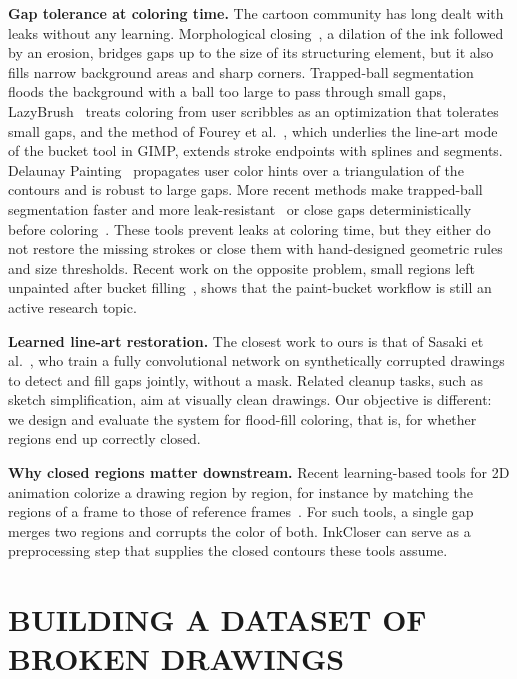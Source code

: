 \documentclass{IEEEcsmag}
\begin{document}
\textbf{Gap tolerance at coloring time.} The cartoon community has long dealt with
leaks without any learning. Morphological closing~\cite{serra1982morphology}, a
dilation of the ink followed by an erosion, bridges gaps up to the size of its
structuring element, but it also fills narrow background areas and sharp corners.
Trapped-ball segmentation~\cite{zhang2009vectorizing} floods the background with a
ball too large to pass through small gaps, LazyBrush~\cite{sykora2009lazybrush}
treats coloring from user scribbles as an optimization that tolerates small gaps,
and the method of Fourey et al.~\cite{fourey2018flat}, which underlies the line-art
mode of the bucket tool in GIMP, extends stroke endpoints with splines and segments.
Delaunay Painting~\cite{parakkat2022delaunay} propagates user color hints over a
triangulation of the contours and is robust to large gaps. More recent methods make
trapped-ball segmentation faster and more leak-resistant~\cite{allen2024leak} or
close gaps deterministically before coloring~\cite{asrin2025gap}. These tools prevent leaks
at coloring time, but they either do not restore the missing strokes or close them
with hand-designed geometric rules and size thresholds. Recent work on the opposite
problem, small regions left unpainted after bucket filling~\cite{kono2026gapfill},
shows that the paint-bucket workflow is still an active research topic.

\textbf{Learned line-art restoration.} The closest work to ours is that of Sasaki et
al.~\cite{sasaki2017joint}, who train a fully convolutional network on synthetically
corrupted drawings to detect and fill gaps jointly, without a mask. Related cleanup
tasks, such as sketch simplification, aim at visually
clean drawings. Our objective is different: we design and evaluate the system for
flood-fill coloring, that is, for whether regions end up correctly closed.

\textbf{Why closed regions matter downstream.} Recent learning-based tools for 2D
animation colorize a drawing region by region, for instance by matching the regions
of a frame to those of reference frames~\cite{dai2024inclusion}.
For such tools, a single gap merges two regions and corrupts the color of both.
InkCloser can serve as a preprocessing step that supplies the closed contours these
tools assume.

\section{BUILDING A DATASET OF BROKEN DRAWINGS}
\end{document}
